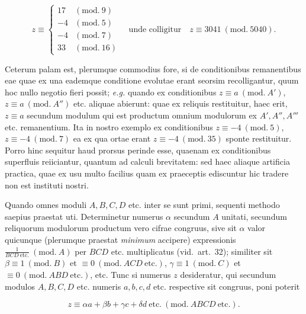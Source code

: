 \[
z\equiv\left\{\begin{array}{rl}
17 & (\mathrm{mod.}\ 9)\\
-4 & (\mathrm{mod.}\ 5)\\
-4 & (\mathrm{mod.}\ 7)\\
33 & (\mathrm{mod.}\ 16)
\end{array}\right.
\quad\text{unde colligitur}\quad z\equiv 3041\ (\mathrm{mod.}\ 5040).
\]

Ceterum palam est, plerumque commodius fore, si de conditionibus remanentibus eae quae
ex una eademque conditione evolutae erant seorsim recolligantur, quum hoc nullo negotio
fieri possit; \emph{e.g.} quando ex conditionibus $z\equiv a\ (\mathrm{mod.}\ A')$,
$z\equiv a\ (\mathrm{mod.}\ A'')$ etc. aliquae abierunt: quae ex reliquis restituitur,
haec erit, $z\equiv a$ secundum modulum qui est productum omnium modulorum ex
$A',A'',A'''$ etc. remanentium. Ita in nostro exemplo ex conditionibus
$z\equiv -4\ (\mathrm{mod.}\ 5)$, $z\equiv -4\ (\mathrm{mod.}\ 7)$ ea ex qua ortae erant
$z\equiv -4\ (\mathrm{mod.}\ 35)$ sponte restituitur. Porro hinc sequitur haud prorsus
perinde esse, quaenam ex conditionibus superfluis reiiciantur, quantum ad calculi
brevitatem: sed haec aliaque artificia practica, quae ex usu multo facilius quam ex
praeceptis ediscuntur hic tradere non est instituti nostri.


Quando omnes moduli $A,B,C,D$ etc. inter se sunt primi, sequenti methodo saepius
praestat uti. Determinetur numerus $\alpha$ secundum $A$ unitati, secundum reliquorum
modulorum productum vero cifrae congruus, sive sit $\alpha$ valor quicunque (plerumque
praestat \emph{minimum} accipere) expressionis $\frac{1}{BCD\ \mathrm{etc.}}\ (\mathrm{mod.}\ A)$
per $BCD$ etc. multiplicatus (vid.\ art.\ 32); similiter sit
$\beta\equiv 1\ (\mathrm{mod.}\ B)$ et $\equiv 0\ (\mathrm{mod.}\ ACD\ \mathrm{etc.})$,
$\gamma\equiv 1\ (\mathrm{mod.}\ C)$ et $\equiv 0\ (\mathrm{mod.}\ ABD\ \mathrm{etc.})$, etc.
Tunc si numerus $z$ desideratur, qui secundum modulos $A,B,C,D$ etc. numeris
$a,b,c,d$ etc. respective sit congruus, poni poterit

\[
z\equiv\alpha a+\beta b+\gamma c+\delta d\ \mathrm{etc.}\ (\mathrm{mod.}\ ABCD\ \mathrm{etc.}).
\]


